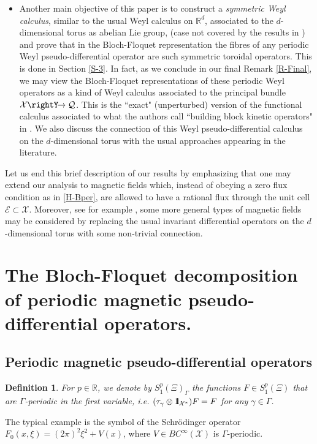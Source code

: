 \documentclass[12pt]{article}
\newtheorem{definition}[theorem]{Definition}
\theoremstyle{definition}
\def\R{\mathbb{R}}
\def\Rd{\mathbb{R}^d}
\def\X{\mathcal X}
\def\E{\mathcal E}
\def\T{\mathcal{Q}}
\def\bb1{{\rm{1}\hspace{-3pt}\mathbf{l}}}
\def\repi{\rightY\hspace*{-4pt}\rightarrow}
\numberwithin{equation}{section}
\begin{document}
\begin{itemize}
\item Another main objective of this paper is to construct a \textit{symmetric Weyl calculus}, similar to the usual Weyl calculus on $\Rd$, associated to the $d$-dimensional torus as abelian Lie group, (case not covered by the results in \cite{W}) and prove that in the Bloch-Floquet representation the fibres of any periodic Weyl pseudo-differential operator are such symmetric toroidal operators. This is done in Section \ref{S-3}. In fact, as we conclude in our final Remark \ref{R-Final}, we may view the Bloch-Floquet representations of these periodic Weyl operators as a kind of Weyl calculus associated to the principal bundle $\X\repi\T$. This is the ``exact" (unperturbed) version of the functional calculus associated to what the authors call ``building block kinetic operators" in \cite{dNL-11}. We also discuss the connection of this Weyl pseudo-differential calculus on the $d$-dimensional torus with the usual approaches appearing in the literature. 
\end{itemize}

{
Let us end this brief description of our results by emphasizing that one may  extend our analysis to magnetic fields which, instead of obeying a zero flux condition as in \eqref{H-Bper},  are allowed to have a rational flux through the unit cell $\E\subset\X$. Moreover, see for example \cite{FT}, some more general types of magnetic fields may be considered by replacing the usual invariant differential operators on the $d$-dimensional torus with some non-trivial connection.}

\section{The Bloch-Floquet decomposition of periodic magnetic pseudo-differential operators.}\label{S-2}



\subsection{Periodic magnetic pseudo-differential operators}\label{SS-2-1}

\begin{definition}
For  $p\in\R$, we denote by ${S}^p_1(\Xi)_{\Gamma}$ the functions $F\in{S}^p_1(\Xi)$ that are $\Gamma$-periodic in the first variable, i.e. $(\tau_\gamma\otimes\bb1_{\X^*})F=F$ for any $\gamma\in\Gamma$. 
\end{definition}
The typical example is the symbol of the Schr\"odinger operator $F_0(x,\xi)=(2\pi)^{2}\xi^2+V(x)$, where  $V\in{BC}^\infty(\X)$  is $\Gamma$-periodic.
\end{document}
